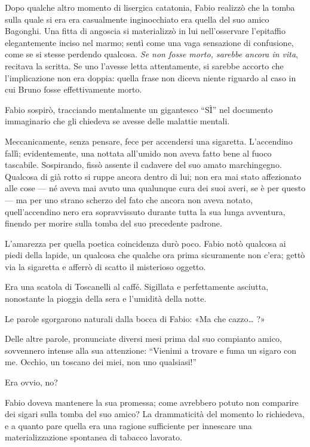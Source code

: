 Dopo qualche altro momento di lisergica catatonia, Fabio realizzò che la tomba sulla quale si era era casualmente inginocchiato era quella del suo amico Bagonghi. Una fitta di angoscia si materializzò in lui nell'osservare l'epitaffio elegantemente inciso nel marmo; sentì come una vaga sensazione di confusione, come se si stesse perdendo qualcosa. \emph{Se non fosse morto, sarebbe ancora in vita}, recitava la scritta. Se uno l'avesse letta attentamente, si sarebbe accorto che l'implicazione non era doppia: quella frase non diceva niente riguardo al caso in cui Bruno fosse effettivamente morto.

Fabio sospirò, tracciando mentalmente un gigantesco ``SÌ'' nel documento immaginario che gli chiedeva se avesse delle malattie mentali.

Meccanicamente, senza pensare, fece per accendersi una sigaretta. L'accendino fallì; evidentemente, una nottata all'umido non aveva fatto bene al fuoco tascabile. Sospirando, fissò assente il cadavere del suo amato marchingegno. Qualcosa di già rotto si ruppe ancora dentro di lui; non era mai stato affezionato alle cose --- né aveva mai avuto una qualunque cura dei suoi averi, se è per questo --- ma per uno strano scherzo del fato che ancora non aveva notato, quell'accendino nero era sopravvissuto durante tutta la sua lunga avventura, finendo per morire sulla tomba del suo precedente padrone.

L'amarezza per quella poetica coincidenza durò poco. Fabio notò qualcosa ai piedi della lapide, un qualcosa che qualche ora prima sicuramente non c'era; gettò via la sigaretta e afferrò di scatto il misterioso oggetto.

Era una scatola di Toscanelli al caffé. Sigillata e perfettamente asciutta, nonostante la pioggia della sera e l'umidità della notte.

Le parole sgorgarono naturali dalla bocca di Fabio: «Ma che cazzo\ldots{} ?»

Delle altre parole, pronunciate diversi mesi prima dal suo compianto amico, sovvennero intense alla sua attenzione: ``Vienimi a trovare e fuma un sigaro con me. Occhio, un toscano dei miei, non uno qualsiasi!''

Era ovvio, no?

Fabio doveva mantenere la sua promessa; come avrebbero potuto non comparire dei sigari sulla tomba del suo amico? La drammaticità del momento lo richiedeva, e a quanto pare quella era una ragione sufficiente per innescare una materializzazione spontanea di tabacco lavorato.

